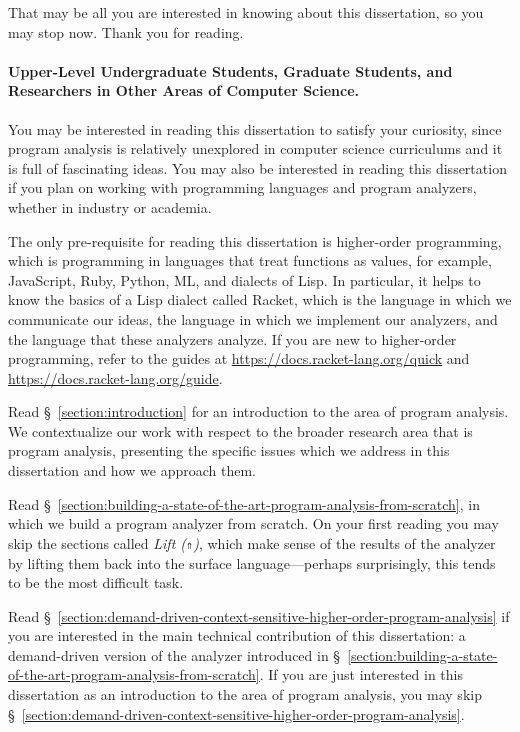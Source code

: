 \documentclass[12pt, oneside]{book}
\begin{document}
That may be all you are interested in knowing about this dissertation, so you may stop now. Thank you for reading.

\paragraph{Upper-Level Undergraduate Students, Graduate Students, and Researchers in Other Areas of Computer Science.}

You may be interested in reading this dissertation to satisfy your curiosity, since program analysis is relatively unexplored in computer science curriculums and it is full of fascinating ideas. You may also be interested in reading this dissertation if you plan on working with programming languages and program analyzers, whether in industry or academia.

The only pre-requisite for reading this dissertation is higher-order programming, which is programming in languages that treat functions as values, for example, JavaScript, Ruby, Python, ML, and dialects of Lisp. In particular, it helps to know the basics of a Lisp dialect called Racket, which is the language in which we communicate our ideas, the language in which we implement our analyzers, and the language that these analyzers analyze. If you are new to higher-order programming, refer to the guides at \url{https://docs.racket-lang.org/quick} and \url{https://docs.racket-lang.org/guide}.

Read §~\ref{section:introduction} for an introduction to the area of program analysis. We contextualize our work with respect to the broader research area that is program analysis, presenting the specific issues which we address in this dissertation and how we approach them.

Read §~\ref{section:building-a-state-of-the-art-program-analysis-from-scratch}, in which we build a program analyzer from scratch. On your first reading you may skip the sections called \emph{Lift (\texttt{⇑})}, which make sense of the results of the analyzer by lifting them back into the surface language—perhaps surprisingly, this tends to be the most difficult task.

Read §~\ref{section:demand-driven-context-sensitive-higher-order-program-analysis} if you are interested in the main technical contribution of this dissertation: a demand-driven version of the analyzer introduced in §~\ref{section:building-a-state-of-the-art-program-analysis-from-scratch}. If you are just interested in this dissertation as an introduction to the area of program analysis, you may skip §~\ref{section:demand-driven-context-sensitive-higher-order-program-analysis}.
\end{document}
